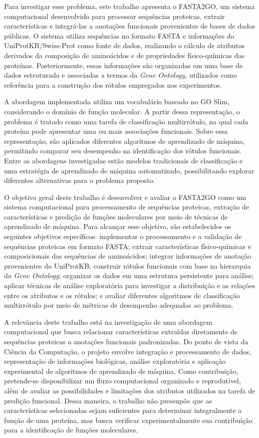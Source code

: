 Para investigar esse problema, este trabalho apresenta o FASTA2GO, um sistema computacional desenvolvido para processar sequências proteicas, extrair características e integrá-las a anotações funcionais provenientes de bases de dados públicas. O sistema utiliza sequências no formato FASTA e informações do UniProtKB/Swiss-Prot como fonte de dados, realizando o cálculo de atributos derivados da composição de aminoácidos e de propriedades físico-químicas das proteínas. Posteriormente, essas informações são organizadas em uma base de dados estruturada e associadas a termos da \textit{Gene Ontology}, utilizados como referência para a construção dos rótulos empregados nos experimentos.

A abordagem implementada utiliza um vocabulário baseado no GO Slim, considerando o domínio de função molecular. A partir dessa representação, o problema é tratado como uma tarefa de classificação multirrótulo, na qual cada proteína pode apresentar uma ou mais associações funcionais. Sobre essa representação, são aplicados diferentes algoritmos de aprendizado de máquina, permitindo comparar seu desempenho na identificação dos rótulos funcionais. Entre as abordagens investigadas estão modelos tradicionais de classificação e uma estratégia de aprendizado de máquina automatizado, possibilitando explorar diferentes alternativas para o problema proposto.

O objetivo geral deste trabalho é desenvolver e avaliar o FASTA2GO como um sistema computacional para processamento de sequências proteicas, extração de características e predição de funções moleculares por meio de técnicas de aprendizado de máquina. Para alcançar esse objetivo, são estabelecidos os seguintes objetivos específicos: implementar o processamento e a validação de sequências proteicas em formato FASTA; extrair características físico-químicas e composicionais das sequências de aminoácidos; integrar informações de anotação provenientes do UniProtKB; construir rótulos funcionais com base na hierarquia da \textit{Gene Ontology}; organizar os dados em uma estrutura persistente para análise; aplicar técnicas de análise exploratória para investigar a distribuição e as relações entre os atributos e os rótulos; e avaliar diferentes algoritmos de classificação multirrótulo por meio de métricas de desempenho adequadas ao problema.

A relevância deste trabalho está na investigação de uma abordagem computacional que busca relacionar características extraídas diretamente de sequências proteicas a anotações funcionais padronizadas. Do ponto de vista da Ciência da Computação, o projeto envolve integração e processamento de dados, representação de informações biológicas, análise exploratória e aplicação experimental de algoritmos de aprendizado de máquina. Como contribuição, pretende-se disponibilizar um fluxo computacional organizado e reprodutível, além de avaliar as possibilidades e limitações dos atributos utilizados na tarefa de predição funcional. Dessa maneira, o trabalho não pressupõe que as características selecionadas sejam suficientes para determinar integralmente a função de uma proteína, mas busca verificar experimentalmente sua contribuição para a identificação de funções moleculares.

